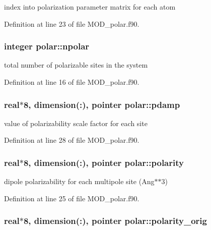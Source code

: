 index into polarization parameter matrix for each atom 



Definition at line 23 of file M\-O\-D\-\_\-polar.\-f90.

\hypertarget{classpolar_a4dab8cc73459eae728463049cf92dd4f}{
\subsubsection[{npolar}]{\setlength{\rightskip}{0pt plus 5cm}integer polar\-::npolar}}\label{classpolar_a4dab8cc73459eae728463049cf92dd4f}


total number of polarizable sites in the system 



Definition at line 16 of file M\-O\-D\-\_\-polar.\-f90.

\hypertarget{classpolar_a55d7218490afd5619f6ae489efa8d659}{
\subsubsection[{pdamp}]{\setlength{\rightskip}{0pt plus 5cm}real$\ast$8, dimension(\-:), pointer polar\-::pdamp}}\label{classpolar_a55d7218490afd5619f6ae489efa8d659}


value of polarizability scale factor for each site 



Definition at line 28 of file M\-O\-D\-\_\-polar.\-f90.

\hypertarget{classpolar_a81e82044b89e2acb286689700555d226}{
\subsubsection[{polarity}]{\setlength{\rightskip}{0pt plus 5cm}real$\ast$8, dimension(\-:), pointer polar\-::polarity}}\label{classpolar_a81e82044b89e2acb286689700555d226}


dipole polarizability for each multipole site (Ang$\ast$$\ast$3) 



Definition at line 25 of file M\-O\-D\-\_\-polar.\-f90.

\hypertarget{classpolar_a23a334fc3e13f4c7405f4542ce8926e0}{
\subsubsection[{polarity\-\_\-orig}]{\setlength{\rightskip}{0pt plus 5cm}real$\ast$8, dimension(\-:), pointer polar\-::polarity\-\_\-orig}}\label{classpolar_a23a334fc3e13f4c7405f4542ce8926e0}


